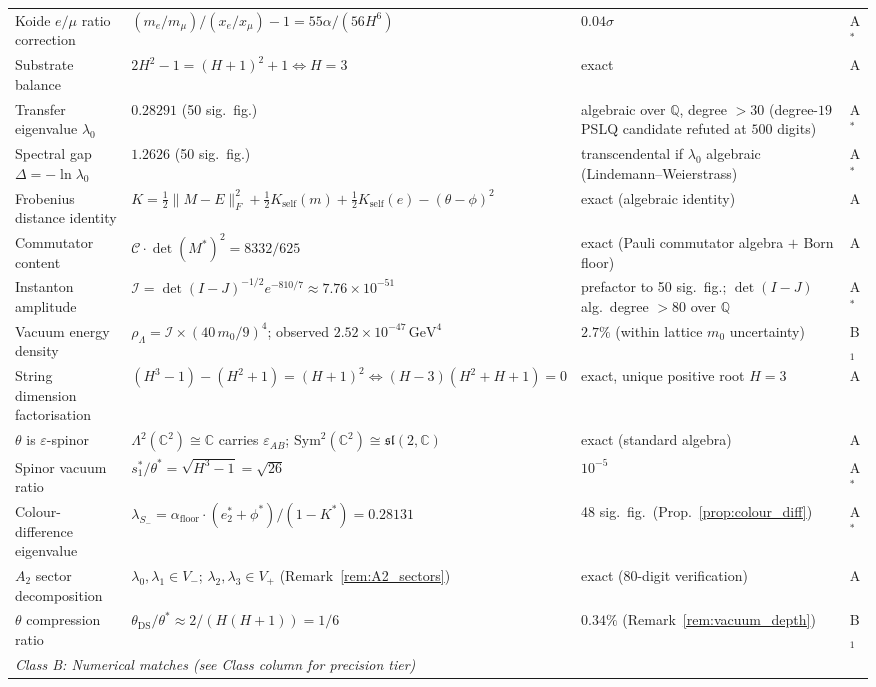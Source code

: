 \documentclass[11pt,a4paper]{article}
\theoremstyle{definition}
\theoremstyle{remark}
\newcommand{\C}{\mathbb{C}}
\begin{document}
\begin{longtable}{p{3.8cm}p{7.2cm}p{3.0cm}l}
Koide $e/\mu$ ratio correction & $(m_e/m_\mu)/(x_e/x_\mu)-1=55\alpha/(56H^6)$ & $0.04\sigma$ & A$^*$ \\
Substrate balance & $2H^2\!-\!1=(H\!+\!1)^2\!+\!1\Leftrightarrow H\!=\!3$ & exact & A \\
Transfer eigenvalue $\lambda_0$ & $0.28291$ (50 sig.~fig.) & algebraic over $\mathbb{Q}$, degree $>30$ (degree-$19$ PSLQ candidate refuted at $500$ digits) & A$^*$ \\
Spectral gap $\Delta=-\ln\lambda_0$ & $1.2626$ (50 sig.~fig.) & transcendental if $\lambda_0$ algebraic (Lindemann--Weierstrass) & A$^*$ \\
Frobenius distance identity & $K=\frac{1}{2}\|M-E\|_F^2+\frac{1}{2}K_{\mathrm{self}}(m)+\frac{1}{2}K_{\mathrm{self}}(e)-(\theta-\phi)^2$ & exact (algebraic identity) & A \\
Commutator content & $\mathcal{C}\cdot\det(M^*)^2=8332/625$ & exact (Pauli commutator algebra $+$ Born floor) & A \\
Instanton amplitude & $\mathcal{I} = \det(I-J)^{-1/2}e^{-810/7} \approx 7.76\times 10^{-51}$ & prefactor to 50 sig.\ fig.; $\det(I-J)$ alg.\ degree $>80$ over $\mathbb{Q}$ & A$^*$ \\
Vacuum energy density & $\rho_\Lambda=\mathcal{I}\times(40\,m_0/9)^4$; observed $2.52\times 10^{-47}\,\mathrm{GeV}^4$ & $2.7\%$ (within lattice $m_0$ uncertainty) & B$_1$ \\
String dimension factorisation & $(H^3-1)-(H^2+1)=(H+1)^2\Leftrightarrow(H-3)(H^2+H+1)=0$ & exact, unique positive root $H=3$ & A \\
$\theta$ is $\varepsilon$-spinor & $\Lambda^2(\C^2)\cong\C$ carries $\varepsilon_{AB}$; $\mathrm{Sym}^2(\C^2)\cong\mathfrak{sl}(2,\C)$ & exact (standard algebra) & A \\
Spinor vacuum ratio & $s_1^*/\theta^*=\sqrt{H^3-1}=\sqrt{26}$ & $10^{-5}$ & A$^*$ \\
Colour-difference eigenvalue & $\lambda_{S_-}=\alpha_{\mathrm{floor}}\cdot(e_2^*+\phi^*)/(1-K^*)=0.28131$ & 48 sig.\ fig.\ (Prop.~\ref{prop:colour_diff}) & A$^*$ \\
$A_2$ sector decomposition & $\lambda_0,\lambda_1\in V_-$; $\lambda_2,\lambda_3\in V_+$ (Remark~\ref{rem:A2_sectors}) & exact (80-digit verification) & A \\
$\theta$ compression ratio & $\theta_{\mathrm{DS}}/\theta^*\approx 2/(H(H\!+\!1))=1/6$ & $0.34\%$ (Remark~\ref{rem:vacuum_depth}) & B$_1$ \\
\midrule
\multicolumn{4}{l}{\textit{Class B: Numerical matches (see Class column for precision tier)}} \\[3pt]

\end{longtable}
\end{document}
